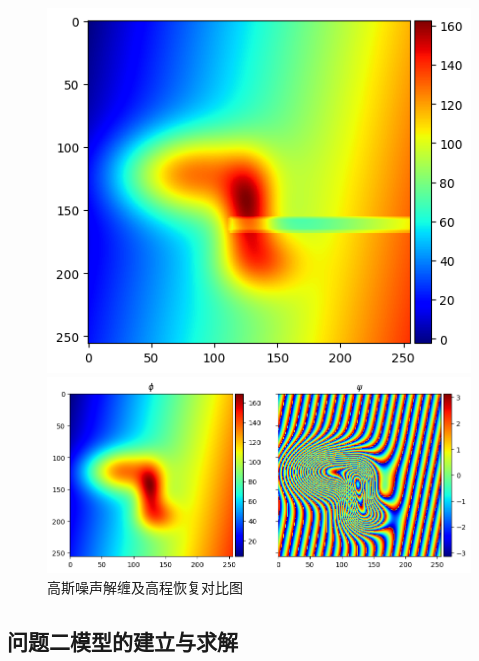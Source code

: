\documentclass[a4paper]{article}
\begin{document}
	\begin{figure}[H]
		\centering
		\begin{minipage}[b]{0.31\textwidth}
			\centering
			\includegraphics[width=\linewidth]{t1/unwrap_gauss.png}
		\end{minipage}
		\hspace{0.05\textwidth}
		\begin{minipage}[b]{0.6\textwidth}
			\centering
			\includegraphics[width=\linewidth]{t1/lstm_gauss.png}
		\end{minipage}
		
		\caption{高斯噪声解缠及高程恢复对比图}
		\label{fig:shortcoming}
	\end{figure}

	
	\subsection{问题二模型的建立与求解}
\end{document}
